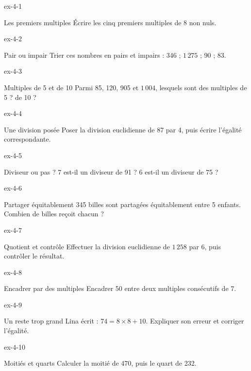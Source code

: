 \clearpage{}
\begin{blocLivre}{ex-4-1}\begin{exercice}[1]{Les premiers multiples}
Écrire les cinq premiers multiples de 8 non nuls.
\end{exercice}\end{blocLivre}
\begin{blocLivre}{ex-4-2}\begin{exercice}[1]{Pair ou impair}
Trier ces nombres en pairs et impairs : 346 ; $1\,275$ ; 90 ; 83.
\end{exercice}\end{blocLivre}
\begin{blocLivre}{ex-4-3}\begin{exercice}[1]{Multiples de 5 et de 10}
Parmi 85, 120, 905 et $1\,004$, lesquels sont des multiples de 5 ? de 10 ?
\end{exercice}\end{blocLivre}
\begin{blocLivre}{ex-4-4}\begin{exercice}[1]{Une division posée}
Poser la division euclidienne de 87 par 4, puis écrire l’égalité correspondante.
\end{exercice}\end{blocLivre}
\begin{blocLivre}{ex-4-5}\begin{exercice}[1]{Diviseur ou pas ?}
7 est-il un diviseur de 91 ? 6 est-il un diviseur de 75 ?
\end{exercice}\end{blocLivre}

\begin{blocLivre}{ex-4-6}\begin{exercice}[2]{Partager équitablement}
345 billes sont partagées équitablement entre 5 enfants. Combien de billes reçoit chacun ?
\end{exercice}\end{blocLivre}
\begin{blocLivre}{ex-4-7}\begin{exercice}[2]{Quotient et contrôle}
Effectuer la division euclidienne de $1\,258$ par 6, puis contrôler le résultat.
\end{exercice}\end{blocLivre}
\begin{blocLivre}{ex-4-8}\begin{exercice}[2]{Encadrer par des multiples}
Encadrer 50 entre deux multiples consécutifs de 7.
\end{exercice}\end{blocLivre}
\begin{blocLivre}{ex-4-9}\begin{exercice}[2]{Un reste trop grand}
Lina écrit : $74=8\times8+10$. Expliquer son erreur et corriger l’égalité.
\end{exercice}\end{blocLivre}
\begin{blocLivre}{ex-4-10}\begin{exercice}[2]{Moitiés et quarts}
Calculer la moitié de 470, puis le quart de 232.
\end{exercice}\end{blocLivre}

